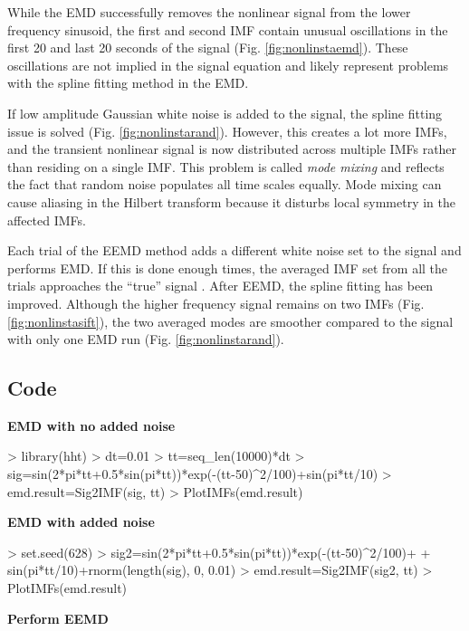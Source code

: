\documentclass[12pt]{article}
\begin{document}
While the EMD successfully removes the nonlinear signal from the lower frequency sinusoid, the first and second IMF contain unusual oscillations in the first 20 and last 20 seconds of the signal (Fig. \ref{fig:nonlinstaemd}).
These oscillations are not implied in the signal equation and likely represent problems with the spline fitting method in the EMD.

If low amplitude Gaussian white noise is added to the signal, the spline fitting issue is solved (Fig. \ref{fig:nonlinstarand}).
However, this creates a lot more IMFs, and the transient nonlinear signal is now distributed across multiple IMFs rather than residing on a single IMF.
This problem is called \emph{mode mixing} and reflects the fact that random noise populates all time scales equally.
Mode mixing can cause aliasing in the Hilbert transform because it disturbs local symmetry in the affected IMFs.

Each trial of the EEMD method adds a different white noise set to the signal and performs EMD. 
If this is done enough times, the averaged IMF set from all the trials approaches the ``true'' signal .
After EEMD, the spline fitting has been improved.
Although the higher frequency signal remains on two IMFs (Fig. \ref{fig:nonlinstasift}), the two averaged modes are smoother compared to the signal with only one EMD run (Fig. \ref{fig:nonlinstarand}).

\subsection{Code}

\textbf{EMD with no added noise}
\begin{Schunk}
\begin{Sinput}
> library(hht)
> dt=0.01
> tt=seq_len(10000)*dt
> sig=sin(2*pi*tt+0.5*sin(pi*tt))*exp(-(tt-50)^2/100)+sin(pi*tt/10)
> emd.result=Sig2IMF(sig, tt)
> PlotIMFs(emd.result)
\end{Sinput}
\end{Schunk}

\textbf{EMD with added noise}
\begin{Schunk}
\begin{Sinput}
> set.seed(628)
> sig2=sin(2*pi*tt+0.5*sin(pi*tt))*exp(-(tt-50)^2/100)+
+     sin(pi*tt/10)+rnorm(length(sig), 0, 0.01)
> emd.result=Sig2IMF(sig2, tt)
> PlotIMFs(emd.result)
\end{Sinput}
\end{Schunk}


\textbf{Perform EEMD}
\end{document}
